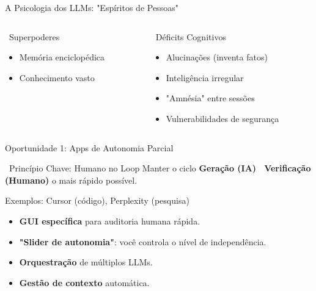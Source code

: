 \documentclass[aspectratio=169,12pt]{beamer}
\begin{document}
\begin{frame}{A Psicologia dos LLMs: "Espíritos de Pessoas"}
    \begin{columns}
        \begin{column}{0.5\textwidth}
            \begin{exampleblock}{\faStar\, Superpoderes}
                \begin{itemize}
                    \item Memória enciclopédica
                    \item Conhecimento vasto
                \end{itemize}
            \end{exampleblock}
        \end{column}
        \begin{column}{0.5\textwidth}
            \begin{alertblock}{\faBug\, Déficits Cognitivos}
                \begin{itemize}
                    \item Alucinações (inventa fatos)
                    \item Inteligência irregular
                    \item "Amnésia" entre sessões
                    \item Vulnerabilidades de segurança
                \end{itemize}
            \end{alertblock}
        \end{column}
    \end{columns}
\end{frame}

\begin{frame}{Oportunidade 1: Apps de Autonomia Parcial}
    \begin{block}{\faWrench\, Princípio Chave: Humano no Loop}
        Manter o ciclo \textbf{Geração (IA) \faArrowRight\, Verificação (Humano)} o mais rápido possível.
    \end{block}
    
    \begin{exampleblock}{Exemplos: Cursor (código), Perplexity (pesquisa)}
        \begin{itemize}
            \item \textbf{GUI específica} para auditoria humana rápida.
            \item \textbf{"Slider de autonomia"}: você controla o nível de independência.
            \item \textbf{Orquestração} de múltiplos LLMs.
            \item \textbf{Gestão de contexto} automática.
        \end{itemize}
    \end{exampleblock}
\end{frame}
\end{document}
